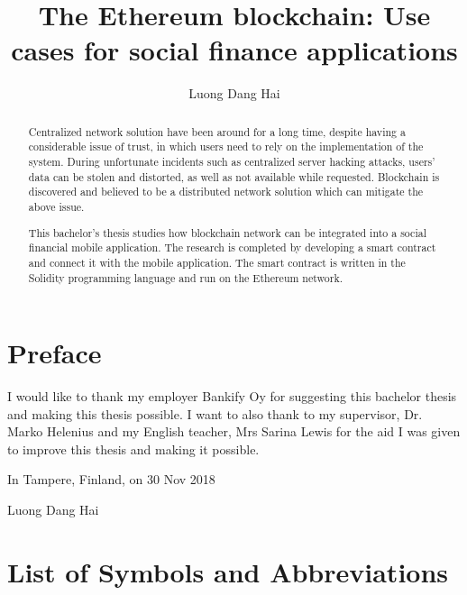 \documentclass[twoside,numperchapter]{tutthesis} %
\author{Luong Dang Hai}
\title{The Ethereum blockchain: Use cases for social finance applications}
\begin{document}
\maketitle



\begin{abstract}

Centralized network solution have been around for a long time, despite having a considerable issue of trust, in which users need to rely on the implementation of the system. During unfortunate incidents such as centralized server hacking attacks, users' data can be stolen and distorted, as well as not available while requested. Blockchain is discovered and believed to be a distributed network solution which can mitigate the above issue.

This bachelor's thesis studies how blockchain network can be integrated into a social financial mobile application. The research is completed by developing a smart contract and connect it with the mobile application. The smart contract is written in the Solidity programming language and run on the Ethereum network.

 
\end{abstract}


\chapter*{Preface}

I would like to thank my employer Bankify Oy for suggesting this bachelor thesis and making this thesis possible. I want to also thank to my supervisor, Dr. Marko Helenius and my English teacher, Mrs Sarina Lewis for the aid I was given to improve this thesis and making it possible.

\vspace{2\baselineskip}

In Tampere, Finland, on 30 Nov 2018

\vspace{2\baselineskip}

Luong Dang Hai



\tableofcontents

\listoffigures



\chapter*{List of Symbols and Abbreviations}
\end{document}

